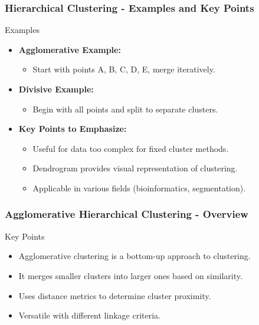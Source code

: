 \documentclass[aspectratio=169]{beamer}
\begin{document}
\begin{frame}[fragile]
    \frametitle{Hierarchical Clustering - Examples and Key Points}
    \begin{block}{Examples}
        \begin{itemize}
            \item \textbf{Agglomerative Example:} 
                \begin{itemize}
                    \item Start with points A, B, C, D, E, merge iteratively.
                \end{itemize}
            \item \textbf{Divisive Example:} 
                \begin{itemize}
                    \item Begin with all points and split to separate clusters.
                \end{itemize}
        \end{itemize}
    \end{block}
    \begin{itemize}
        \item \textbf{Key Points to Emphasize:}
            \begin{itemize}
                \item Useful for data too complex for fixed cluster methods.
                \item Dendrogram provides visual representation of clustering.
                \item Applicable in various fields (bioinformatics, segmentation).
            \end{itemize}
    \end{itemize}
\end{frame}

\begin{frame}[fragile]
    \frametitle{Agglomerative Hierarchical Clustering - Overview}
    \begin{block}{Key Points}
        \begin{itemize}
            \item Agglomerative clustering is a bottom-up approach to clustering.
            \item It merges smaller clusters into larger ones based on similarity.
            \item Uses distance metrics to determine cluster proximity.
            \item Versatile with different linkage criteria.
        \end{itemize}
    \end{block}
\end{frame}
\end{document}
